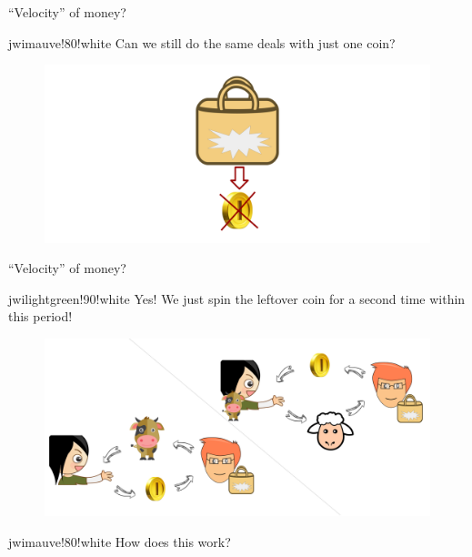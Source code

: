\begin{frame}{``Velocity'' of money?}
	\vspace{1ex}
	\begin{alertblockc}{}{jwimauve!80!white}%
		Can we still do the same deals with just one coin?
	\end{alertblockc}
  \begin{figure}
    \centerline{\includegraphics[scale=0.15]{./pics/used/sheep_example_intro_HR(4)}}
  \end{figure}
\end{frame}

\begin{frame}{``Velocity'' of money?}
	\vspace{1ex}
	\begin{alertblockc}[N]{}{jwilightgreen!90!white}%
		Yes! We just spin the leftover coin for a second time within this period!%
	\end{alertblockc}
  \begin{figure}
    \centerline{\includegraphics[scale=0.12]{./pics/used/sheep_example_intro_HR(5)}}
  \end{figure}
	\vspace{-1.5em}
	\begin{alertblockc}{}{jwimauve!80!white}%
		How does this work?
	\end{alertblockc}
\end{frame}





